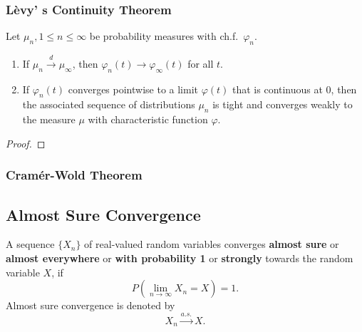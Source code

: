 \subsubsection{L\`evy' s Continuity Theorem}

\begin{theorem}
	Let \(\mu_{n},1\leq n\leq\infty\) be probability measures with ch.f.\ \(\varphi_{n}\).
	\begin{enumerate}
		\item If \(\mu_{n}\stackrel{d}{\rightarrow}\mu_{\infty}\), then \(\varphi_{n}(t)\rightarrow\varphi_{\infty}(t)\) for all \(t\).
		\item If \(\varphi_{n}(t)\) converges pointwise to a limit \(\varphi(t)\) that is continuous at \(0\), then the associated sequence of distributions \(\mu_{n}\) is tight and converges weakly to the measure \(\mu\) with characteristic function \(\varphi\).
	\end{enumerate}
\end{theorem}

\begin{proof}

\end{proof}

\subsubsection{Cram\'er-Wold Theorem}

\begin{theorem}\label{thm:cramer-wold-theorem}

\end{theorem}

\subsection{Almost Sure Convergence}

\begin{definition}
	A sequence \(\{X_n\}\) of real-valued random variables converges \textbf{almost sure} or \textbf{almost everywhere} or \textbf{with probability 1} or \textbf{strongly} towards the random variable \(X\), if
	\begin{equation}
		P\left(\lim_{n\to\infty}X_n=X\right)=1.
	\end{equation}
	Almost sure convergence is denoted by
	\begin{equation}
		X_n \stackrel{a.s.}{\rightarrow} X.
	\end{equation}
\end{definition}


